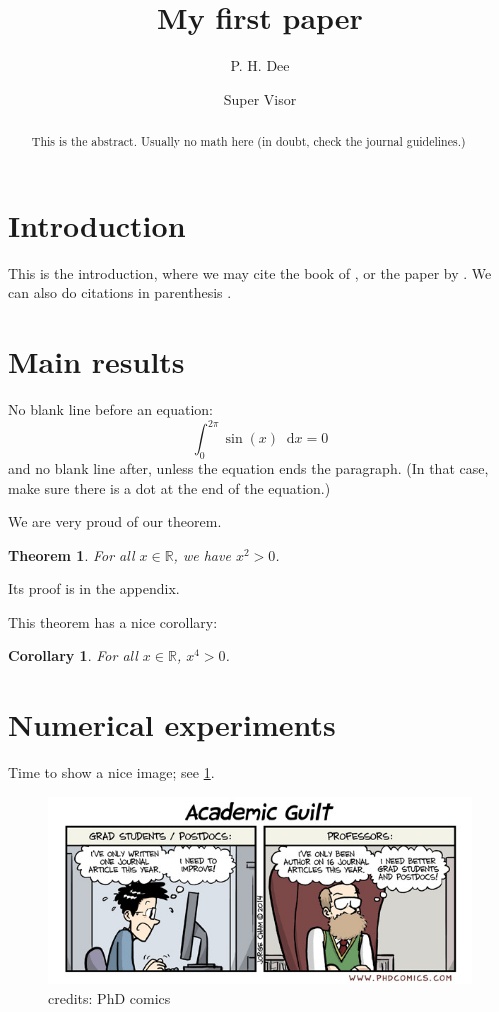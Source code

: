 \documentclass{scrartcl}  %
\newtheorem{thm}{Theorem}
\newtheorem{cor}{Corollary}
\newcommand{\R}{\mathbb{R}} %
\newcommand*\dd{\mathop{}\!\mathrm{d}} %
\begin{document}
\title{My first paper}
\author{P. H. Dee \and Super Visor}
\date{}  %
\maketitle

\begin{abstract}
  This is the abstract. Usually no math here (in doubt, check the journal
  guidelines.)
\end{abstract}

\section{Introduction}\label{sec:intro}

This is the introduction, where we may cite the book of \citet{book_sasha}, or
the paper by \citet{cristina_arxiv}.  We can also do citations in parenthesis
\citep{anna_mirror}.


\section{Main results}\label{sec:results}

No blank line before an equation:
\[ \int_0^{2\pi} \sin(x) \dd x = 0
\]
and no blank line after, unless the equation ends the paragraph. (In that case,
make sure there is a dot at the end of the equation.)

We are very proud of our theorem.
\begin{thm}
  For all $x \in \R$, we have $x^2 > 0$.
\end{thm}
Its proof is in the appendix.

This theorem has a nice corollary:
\begin{cor}
  For all $x \in \R$, $x^4 > 0$.
\end{cor}

\section{Numerical experiments}\label{sec:numerics}

Time to show a nice image; see \cref{fig:boxplot_first}.

\begin{figure}
  \begin{center}
    \includegraphics[scale=0.4]{figs/phd_guilt.jpg}
  \end{center}
  \caption{credits: PhD comics}
  \label{fig:boxplot_first}
\end{figure}
\end{document}
